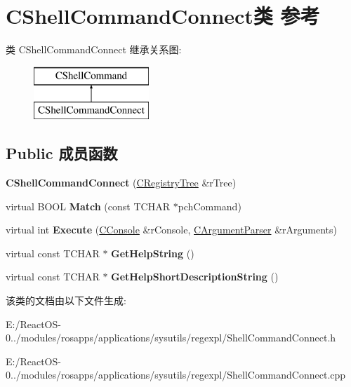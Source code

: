 \hypertarget{class_c_shell_command_connect}{}\section{C\+Shell\+Command\+Connect类 参考}
\label{class_c_shell_command_connect}
类 C\+Shell\+Command\+Connect 继承关系图\+:\begin{figure}[H]
\begin{center}
\leavevmode
\includegraphics[height=2.000000cm]{class_c_shell_command_connect}
\end{center}
\end{figure}
\subsection*{Public 成员函数}
\begin{DoxyCompactItemize}
\item 
\mbox{\label{class_c_shell_command_connect_ad568d7de15df45c0ab3e1880c292d4f0}} 
{\bfseries C\+Shell\+Command\+Connect} (\hyperlink{class_c_registry_tree}{C\+Registry\+Tree} \&r\+Tree)
\item 
\mbox{\label{class_c_shell_command_connect_a3acd37d4ad0a650091d79ef49e566383}} 
virtual B\+O\+OL {\bfseries Match} (const T\+C\+H\+AR $\ast$pch\+Command)
\item 
\mbox{\label{class_c_shell_command_connect_a592b9e455b94bb5e42f4c1a25c1a4e9f}} 
virtual int {\bfseries Execute} (\hyperlink{class_c_console}{C\+Console} \&r\+Console, \hyperlink{class_c_argument_parser}{C\+Argument\+Parser} \&r\+Arguments)
\item 
\mbox{\label{class_c_shell_command_connect_a3ef2c00e496714ae23aa97af3c55a21c}} 
virtual const T\+C\+H\+AR $\ast$ {\bfseries Get\+Help\+String} ()
\item 
\mbox{\label{class_c_shell_command_connect_ab5752053877ceb6f5d78e4f92856e3f1}} 
virtual const T\+C\+H\+AR $\ast$ {\bfseries Get\+Help\+Short\+Description\+String} ()
\end{DoxyCompactItemize}


该类的文档由以下文件生成\+:\begin{DoxyCompactItemize}
\item 
E\+:/\+React\+O\+S-\/0../modules/rosapps/applications/sysutils/regexpl/Shell\+Command\+Connect.\+h\item 
E\+:/\+React\+O\+S-\/0../modules/rosapps/applications/sysutils/regexpl/Shell\+Command\+Connect.\+cpp\end{DoxyCompactItemize}
